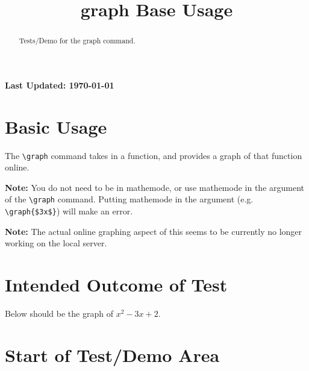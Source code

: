\documentclass{ximera}
\title{graph Base Usage}
\begin{document}
\begin{abstract}
    Tests/Demo for the graph command.
\end{abstract}
\maketitle

{{\Huge \bfseries Last Updated: \today}} \\


\section{Basic Usage}
The \verb|\graph| command takes in a function, and provides a graph of that function online.

\textbf{Note:} You do not need to be in mathemode, or use mathemode in the argument of the \verb|\graph| command. 
Putting mathemode in the argument (e.g. \verb|\graph{$3x$}|) will make an error. 

\textbf{Note:} The actual online graphing aspect of this seems to be currently no longer working on the local server.

\section{Intended Outcome of Test}
Below should be the graph of $x^2 - 3x + 2$.

\section{Start of Test/Demo Area}

\hrulefill
\end{document}
